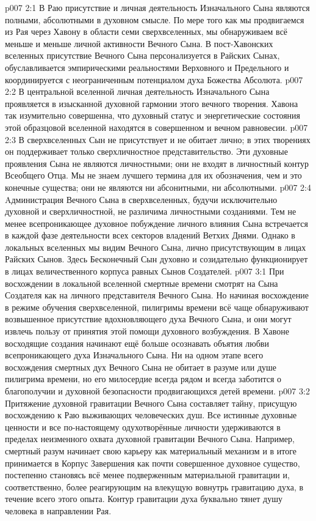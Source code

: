 \vs p007 2:1 В Раю присутствие и личная деятельность Изначального Сына являются полными, абсолютными в духовном смысле. По мере того как мы продвигаемся из Рая через Хавону в области семи сверхвселенных, мы обнаруживаем всё меньше и меньше личной активности Вечного Сына. В пост\hyp{}Хавонских вселенных присутствие Вечного Сына персонализуется в Райских Сынах, обуславливается эмпирическими реальностями Верховного и Предельного и координируется с неограниченным потенциалом духа Божества Абсолюта.
\vs p007 2:2 В центральной вселенной личная деятельность Изначального Сына проявляется в изысканной духовной гармонии этого вечного творения. Хавона так изумительно совершенна, что духовный статус и энергетические состояния этой образцовой вселенной находятся в совершенном и вечном равновесии.
\vs p007 2:3 В сверхвселенных Сын не присутствует и не обитает лично; в этих творениях он поддерживает только сверхличностное представительство. Эти духовные проявления Сына не являются личностными; они не входят в личностный контур Всеобщего Отца. Мы не знаем лучшего термина для их обозначения, чем  и это конечные существа; они не являются ни абсонитными, ни абсолютными.
\vs p007 2:4 Aдминистрация Вечного Сына в сверхвселенных, будучи исключительно духовной и сверхличностной, не различима личностными созданиями. Тем не менее всепроникающее духовное побуждение личного влияния Сына встречается в каждой фазе деятельности всех секторов владений Ветхих Днями. Однако в локальных вселенных мы видим Вечного Сына, лично присутствующим в лицах Райских Сынов. Здесь Бесконечный Сын духовно и созидательно функционирует в лицах величественного корпуса равных Сынов Создателей.
\vs p007 3:1 При восхождении в локальной вселенной смертные времени смотрят на Сына Создателя как на личного представителя Вечного Сына. Но начиная восхождение в режиме обучения сверхвселенной, пилигримы времени всё чаще обнаруживают возвышенное присутствие вдохновляющего духа Вечного Сына, и они могут извлечь пользу от принятия этой помощи духовного возбуждения. В Хавоне восходящие создания начинают ещё больше осознавать объятия любви всепроникающего духа Изначального Сына. Ни на одном этапе всего восхождения смертных дух Вечного Сына не обитает в разуме или душе пилигрима времени, но его милосердие всегда рядом и всегда заботится о благополучии и духовной безопасности продвигающихся детей времени.
\vs p007 3:2 Притяжение духовной гравитации Вечного Сына составляет тайну, присущую восхождению к Раю выживающих человеческих душ. Все истинные духовные ценности и все по\hyp{}настоящему одухотворённые личности удерживаются в пределах неизменного охвата духовной гравитации Вечного Сына. Например, смертный разум начинает свою карьеру как материальный механизм и в итоге принимается в Корпус Завершения как почти совершенное духовное существо, постепенно становясь всё менее подверженным материальной гравитации и, соответственно, более реагирующим на влекущую вовнутрь гравитацию духа, в течение всего этого опыта. Контур гравитации духа буквально тянет душу человека в направлении Рая.
